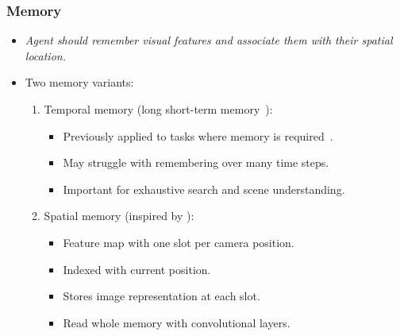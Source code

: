 \begin{frame}
    \frametitle{Memory}

    \begin{itemize}
        \item \textit{Agent should remember visual features and associate them with their spatial location.}
        \item Two memory variants:
        \begin{enumerate}
            \item Temporal memory (long short-term memory~\cite{hochreiter_long_1997}):
            \begin{itemize}
                \item Previously applied to tasks where memory is required~\cite{hausknecht_deep_2017,mnih_asynchronous_2016,mirowski_learning_2017,gupta_cognitive_2019}.
                \item May struggle with remembering over many time steps.
                \item Important for exhaustive search and scene understanding.
            \end{itemize}
            \item Spatial memory (inspired by \cite{parisotto_neural_2017}):
            \begin{itemize}
                \item Feature map with one slot per camera position.
                \item Indexed with current position.
                \item Stores image representation at each slot.
                \item Read whole memory with convolutional layers.
            \end{itemize}
        \end{enumerate}
    \end{itemize}
\end{frame}

